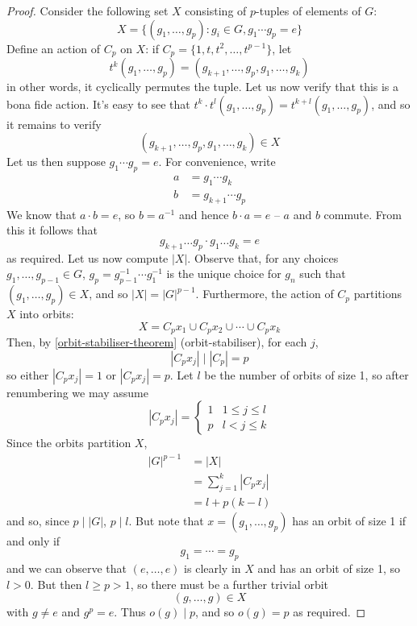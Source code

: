 \documentclass{../template/note}
\begin{document}
    \begin{proof}
        Consider the following set \(X\) consisting of \(p\)-tuples of elements of \(G\):
        \[
            X = \{(g_1, \dots, g_p): g_i \in G, g_1 \cdots g_p = e\}
        \]
        Define an action of \(C_p\) on \(X\): if \(C_p = \{1, t, t^2, \dots, t^{p-1}\}\), let
        \[
            t^k(g_1, \dots, g_p) = (g_{k+1}, \dots, g_p, g_1, \dots, g_k)
        \]
        in other words, it cyclically permutes the tuple. Let us now verify that this is a bona fide action. It's easy to see that \(t^k \cdot t^l (g_1, \dots, g_p) = t^{k+l} (g_1, \dots, g_p)\), and so it remains to verify
        \[
            (g_{k+1}, \dots, g_p, g_1, \dots, g_k) \in X
        \]
        Let us then suppose \(g_1 \cdots g_p = e\). For convenience, write
        \begin{align*}
            a &= g_1 \cdots g_k \\
            b &= g_{k+1} \cdots g_p
        \end{align*}
        We know that \(a \cdot b = e\), so \(b = a^{-1}\) and hence \(b \cdot a = e\) -- \(a\) and \(b\) commute. From this it follows that
        \[
            g_{k+1} \dots g_p \cdot g_1 \dots g_k = e
        \]
        as required. Let us now compute \(|X|\). Observe that, for any choices \(g_1, \dots, g_{p-1} \in G\), \(g_p = g_{p-1}^{-1} \cdots g_1^{-1}\) is the unique choice for \(g_n\) such that \((g_1, \dots, g_p) \in X\), and so \(|X| = |G|^{p-1}\). Furthermore, the action of \(C_p\) partitions \(X\) into orbits:
        \[
            X = C_p x_1 \cup C_p x_2 \cup \cdots \cup C_p x_k
        \]
        Then, by \cref{orbit-stabiliser-theorem} (orbit-stabiliser), for each \(j\),
        \[
            |C_p x_j| \;\big\vert\; |C_p| = p
        \] 
        so either \(|C_p x_j| = 1\) or \(|C_p x_j| = p\). Let \(l\) be the number of orbits of size 1, so after renumbering we may assume
        \[
            |C_p x_j| =
            \begin{cases}
                1 & 1 \leq j \leq l \\
                p & l < j \leq k
            \end{cases}
        \]
        Since the orbits partition \(X\),
        \begin{align*}
            |G|^{p-1} &= |X| \\
            &= \sum_{j=1}^k |C_px_j| \\
            &= l + p(k-l)
        \end{align*}
        and so, since \(p \mid |G|\), \(p \mid l\). But note that \(x = (g_1, \dots, g_p)\) has an orbit of size 1 if and only if
        \[
            g_1 = \cdots = g_p
        \]
        and we can observe that \((e, \dots, e)\) is clearly in \(X\) and has an orbit of size 1, so \(l > 0\). But then \(l \geq p > 1\), so there must be a further trivial orbit
        \[
            (g, \dots, g) \in X
        \]
        with \(g \neq e\) and \(g^p = e\). Thus \(o(g) \mid p\), and so \(o(g) = p\) as required.
        
    \end{proof}
\end{document}

